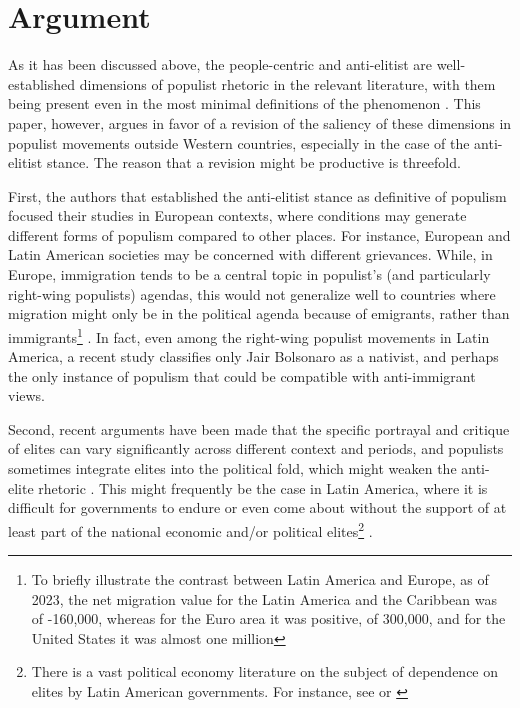 \documentclass[12pt,letterpaper]{article}
\begin{document}
\section{Argument} 

\vspace{.25cm}
\noindent As it has been discussed above, the people-centric and anti-elitist are well-established dimensions of populist rhetoric in the relevant literature, with them being present even in the most minimal definitions of the phenomenon\autocite{gurievPoliticalEconomyPopulism2022} . This paper, however, argues in favor of a revision of the saliency of these dimensions in populist movements outside Western countries, especially in the case of the anti-elitist stance. The reason that a revision might be productive is threefold. 

First, the authors that established the anti-elitist stance as definitive of populism focused their studies in European contexts, where conditions may generate different forms of populism compared to other places. For instance, European and Latin American societies may be concerned with different grievances. While, in Europe, immigration tends to be a central topic in populist's (and particularly right-wing populists) agendas, this would not generalize well to countries where migration might only be in the political agenda because of emigrants, rather than immigrants\footnote{To briefly illustrate the contrast between Latin America and Europe, as of 2023, the net migration value for the Latin America and the Caribbean was of -160,000, whereas for the Euro area it was positive, of 300,000, and for the United States it was almost one million\autocite{WorldBankOpen2022}} . In fact, even among the right-wing populist movements in Latin America, a recent study\autocite{kestlerRadicalNativistAuthoritarian2022a} classifies only Jair Bolsonaro as a nativist, and perhaps the only instance of populism that could be compatible with anti-immigrant views. 

Second, recent arguments have been made that the specific portrayal and critique of elites can vary significantly across different context and periods, and populists sometimes integrate elites into the political fold, which might weaken the anti-elite rhetoric\autocite{hawkinsIdeationalApproachPopulism2017} . This might frequently be the case in Latin America, where it is difficult for governments to endure or even come about without the support of at least part of the national economic and/or political elites\footnote{There is a vast political economy literature on the subject of dependence on elites by Latin American governments. For instance, see\autocite{lopezStatesElitesInequality2018} or \autocite{alcantaraPoliticsPoliticalElites2020}} . 
\end{document}

